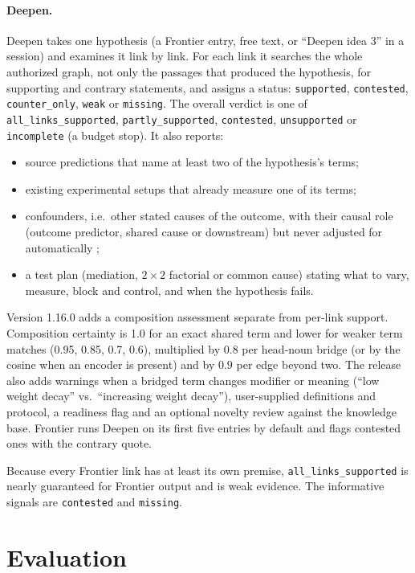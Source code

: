 \documentclass[11pt]{article}
\begin{document}
\paragraph{Deepen.} Deepen takes one hypothesis (a Frontier entry, free text, or ``Deepen idea 3'' in a session)
and examines it link by link. For each link it searches the whole authorized graph, not only the passages that
produced the hypothesis, for supporting and contrary statements, and assigns a status: \texttt{supported},
\texttt{contested}, \texttt{counter\_only}, \texttt{weak} or \texttt{missing}. The overall verdict is one of
\texttt{all\_links\_supported}, \texttt{partly\_supported}, \texttt{contested}, \texttt{unsupported} or
\texttt{incomplete} (a budget stop). It also reports:
\begin{itemize}
  \item source predictions that name at least two of the hypothesis's terms;
  \item existing experimental setups that already measure one of its terms;
  \item confounders, i.e.\ other stated causes of the outcome, with their causal role (outcome predictor, shared
        cause or downstream) but never adjusted for automatically \cite{pearl2009causality};
  \item a test plan (mediation, $2\times2$ factorial or common cause) stating what to vary, measure, block and
        control, and when the hypothesis fails.
\end{itemize}
Version 1.16.0 adds a composition assessment separate from per-link support. Composition certainty is 1.0 for an
exact shared term and lower for weaker term matches (0.95, 0.85, 0.7, 0.6), multiplied by $0.8$ per head-noun
bridge (or by the cosine when an encoder is present) and by $0.9$ per edge beyond two. The release also adds
warnings when a bridged term changes modifier or meaning (``low weight decay'' vs.\ ``increasing weight decay''),
user-supplied definitions and protocol, a readiness flag and an optional novelty review against the knowledge
base. Frontier runs Deepen on its first five entries by default and flags contested ones with the contrary quote.

Because every Frontier link has at least its own premise, \texttt{all\_links\_supported} is nearly guaranteed for
Frontier output and is weak evidence. The informative signals are \texttt{contested} and \texttt{missing}.

\section{Evaluation}
\label{sec:eval}
\end{document}
